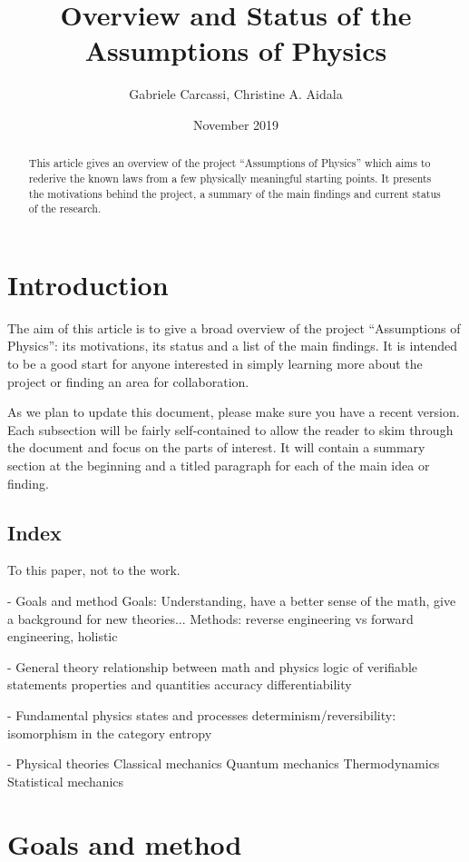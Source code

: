 \documentclass[twocolumn]{article}
\title{Overview and Status of the Assumptions of Physics}
\author{Gabriele Carcassi, Christine A. Aidala}
\date{November 2019}
\begin{document}
\maketitle

\begin{abstract}
	This article gives an overview of the project ``Assumptions of Physics'' which aims to rederive the known laws from a few physically meaningful starting points. It presents the motivations behind the project, a summary of the main findings and current status of the research.	
\end{abstract}

\section{Introduction}

The aim of this article is to give a broad overview of the project ``Assumptions of Physics'': its motivations, its status and a list of the main findings. It is intended to be a good start for anyone interested in simply learning more about the project or finding an area for collaboration.

As we plan to update this document, please make sure you have a recent version. Each subsection will be fairly self-contained to allow the reader to skim through the document and focus on the parts of interest. It will contain a summary section at the beginning and a titled paragraph for each of the main idea or finding.

\subsection{Index}
To this paper, not to the work.

- Goals and method
Goals: Understanding, have a better sense of the math, give a background for new theories...
Methods: reverse engineering vs forward engineering, holistic

- General theory
relationship between math and physics
logic of verifiable statements
properties and quantities
accuracy
differentiability

- Fundamental physics
states and processes
determinism/reversibility: isomorphism in the category
entropy

- Physical theories
Classical mechanics
Quantum mechanics
Thermodynamics
Statistical mechanics

\section{Goals and method}
\end{document}
